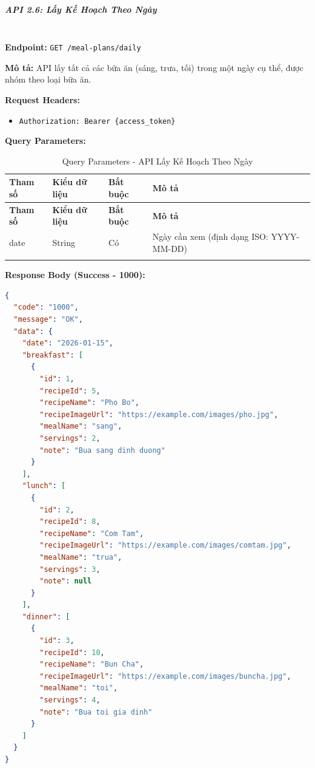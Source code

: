 \normalsize

\subparagraph{API 2.6: Lấy Kế Hoạch Theo Ngày}~\\

\textbf{Endpoint:} \texttt{GET /meal-plans/daily}

\textbf{Mô tả:} API lấy tất cả các bữa ăn (sáng, trưa, tối) trong một ngày cụ thể, được nhóm theo loại bữa ăn.

\textbf{Request Headers:}
\begin{itemize}
    \item \texttt{Authorization: Bearer \{access\_token\}}
\end{itemize}

\textbf{Query Parameters:}

\small
\begin{longtable}{|>{\raggedright\arraybackslash}p{3cm}|>{\raggedright\arraybackslash}p{2.5cm}|>{\raggedright\arraybackslash}p{2cm}|>{\raggedright\arraybackslash}p{6cm}|}
\hline
\textbf{Tham số} & \textbf{Kiểu dữ liệu} & \textbf{Bắt buộc} & \textbf{Mô tả} \\
\hline
\endfirsthead
\hline
\textbf{Tham số} & \textbf{Kiểu dữ liệu} & \textbf{Bắt buộc} & \textbf{Mô tả} \\
\hline
\endhead
date & String & Có & Ngày cần xem (định dạng ISO: YYYY-MM-DD) \\
\hline
\caption{Query Parameters - API Lấy Kế Hoạch Theo Ngày}
\end{longtable}

\textbf{Response Body (Success - 1000):}

\begin{lstlisting}[language=json, caption=Response thanh cong API 2.6]
{
  "code": "1000",
  "message": "OK",
  "data": {
    "date": "2026-01-15",
    "breakfast": [
      {
        "id": 1,
        "recipeId": 5,
        "recipeName": "Pho Bo",
        "recipeImageUrl": "https://example.com/images/pho.jpg",
        "mealName": "sang",
        "servings": 2,
        "note": "Bua sang dinh duong"
      }
    ],
    "lunch": [
      {
        "id": 2,
        "recipeId": 8,
        "recipeName": "Com Tam",
        "recipeImageUrl": "https://example.com/images/comtam.jpg",
        "mealName": "trua",
        "servings": 3,
        "note": null
      }
    ],
    "dinner": [
      {
        "id": 3,
        "recipeId": 10,
        "recipeName": "Bun Cha",
        "recipeImageUrl": "https://example.com/images/buncha.jpg",
        "mealName": "toi",
        "servings": 4,
        "note": "Bua toi gia dinh"
      }
    ]
  }
}
\end{lstlisting}

